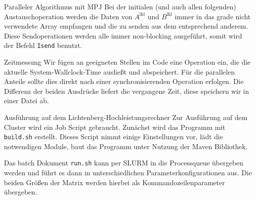 \documentclass[
ngerman,
subtask=ruled %
]{tudaexercise}
\begin{document}
\begin{task}{Paralleler Algorithmus mit MPJ}
		Bei der initialen (und auch allen folgenden) Austauschoperation werden die Daten von $A^{\mathrm{lkl}}$ und $B^{\mathrm{lkl}}$ immer in das grade nicht verwendete Array empfangen und die zu senden aus dem entsprechend anderem.
		Diese Sendoperationen werden alle immer non-blocking ausgeführt, somit wird der Befehl \texttt{Isend} benutzt.
	\end{task}
	
	\begin{task}{Zeitmessung}
		Wir fügen an geeigneten Stellen im Code eine Operation ein, die die aktuelle System-Wallclock-Time ausließt und abspeichert.
		Für die parallelen Anteile sollte dies direkt nach einer synchronisierenden Operation erfolgen.
		Die Differenz der beiden Ausdrücke liefert die vergangene Zeit, diese speichern wir in einer Datei ab.
		
	\end{task}
	
	\begin{task}{Ausführung auf dem Lichtenberg-Hochleistungsrechner} 
		Zur Ausführung auf dem Cluster wird ein Job Script gebraucht. 
		Zunächst wird das Programm mit \texttt{build.sh} erstellt.
		Dieses Script nimmt einige Einstellungen vor, lädt die notwendigen Module, baut das Programm unter Nutzung der Maven Bibliothek.
	
		Das batch Dokument \texttt{run.sh} kann per SLURM in die Processqueue übergeben werden und führt es dann in unterschiedlichen Parameterkonfigurationen aus.
		Die beiden Größen der Matrix werden hierbei als Kommandozeilenparameter übergeben.
	\end{task}

	
\end{document}
